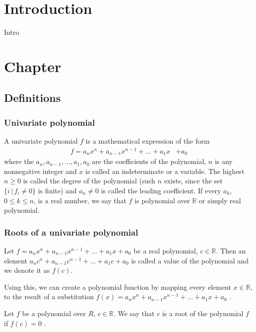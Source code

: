 \documentclass[
  digital, %
  table,   %
  nolof,     %
  nolot,     %
	draft, %
]{fithesis3}
\begin{document}
\newtheorem{theorem}{Theorem}[section] %
\chapter{Introduction}
Intro

\chapter{Chapter}
\section{Definitions}
\subsection{Univariate polynomial}
A univariate polynomial $f$ is a mathematical expression of the form
\begin{align}
       f = a_{n}x^{n}  +  a_{n-1}x^{n-1} +  \ldots  +  a_{1}x  &+  a_{0} \label{eq:polynom}
\end{align}
\newcommand{\R}{\mathbb{R}}
\newcommand{\N}{\mathbb{N}}
where the $a_{n}, a_{n-1}, \ldots, a_{1}, a_{0}$  are the coefficients of the polynomial, $n$ is any nonnegative integer and $x$ is called an indeterminate or a variable.  The highest $n \geq 0$ is called the degree of the polynomial (such $n$ exists, since the set $\{i \, | \, f_{i} \neq 0 \}$ is finite) and $a_{n} \neq 0$ is called the leading coefficient. If every $a_{k}$, $0\leq{k}\leq{n}$, is a real number, we say that $f$ is polynomial over $\R$ or simply real polynomial.

\subsection{Roots of a univariate polynomial}
Let $f = a_{n}x^{n}  +  a_{n-1}x^{n-1} +  \ldots  +  a_{1}x  +  a_{0}$ be a real polynomial, $c\in\R$. Then an element $a_{n}c^{n}  +  a_{n-1}c^{n-1} +  \ldots  +  a_{1}c  +  a_{0}$ is called a value of the polynomial and we denote it as $f(c)$.

Using this, we can create a polynomial function by mapping every element $x\in\R$, to the result of a substitution $f(x) = a_{n}x^{n}  +  a_{n-1}x^{n-1} +  \ldots  +  a_{1}x  +  a_{0}$ \parencite{polynomialsChina}.

Let $f$ be a polynomial over $R$, $c\in\R$. We say that $c$ is a root of the polynomial $f$ if $f(c) = 0$ \parencite{rosicky07}.
\end{document}

